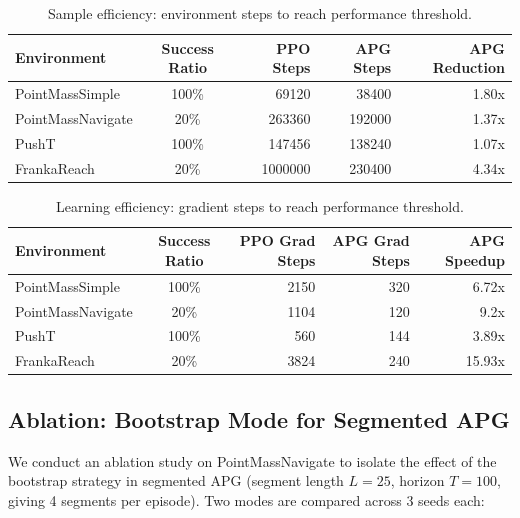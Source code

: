 \documentclass[11pt,a4paper]{article}
\begin{document}
\begin{table}[htbp]
  \centering
  \caption{Sample efficiency: environment steps to reach performance threshold.}
  \label{tab:sample_eff}
  \begin{tabular}{@{}lcrrr@{}}
    \toprule
    \textbf{Environment} & \textbf{Success Ratio} & \textbf{PPO Steps} & \textbf{APG Steps} & \textbf{APG Reduction} \\
    \midrule
    PointMassSimple & 100\% & 69120 & 38400 & 1.80x \\
    PointMassNavigate & 20\% & 263360 & 192000 & 1.37x \\
    PushT             & 100\% & 147456 & 138240 & 1.07x \\
    FrankaReach       & 20\% & 1000000 & 230400 & 4.34x \\
    \bottomrule
  \end{tabular}
\end{table}

\begin{table}[htbp]
  \centering
  \caption{Learning efficiency: gradient steps to reach performance threshold.}
  \label{tab:grad_eff}
  \begin{tabular}{@{}lcrrr@{}}
    \toprule
    \textbf{Environment} & \textbf{Success Ratio} & \textbf{PPO Grad Steps} & \textbf{APG Grad Steps} & \textbf{APG Speedup} \\
    \midrule
    PointMassSimple & 100\% & 2150 & 320 & 6.72x \\
    PointMassNavigate & 20\% & 1104 & 120 & 9.2x \\
    PushT             & 100\% & 560 & 144 & 3.89x \\
    FrankaReach       & 20\% & 3824 & 240 & 15.93x \\
    \bottomrule
  \end{tabular}
\end{table}

\subsection{Ablation: Bootstrap Mode for Segmented APG}
\label{sec:ablation_bootstrap}

We conduct an ablation study on PointMassNavigate to isolate the effect of the bootstrap strategy in segmented APG (segment length $L=25$, horizon $T=100$, giving 4 segments per episode). Two modes are compared across 3 seeds each:
\end{document}
